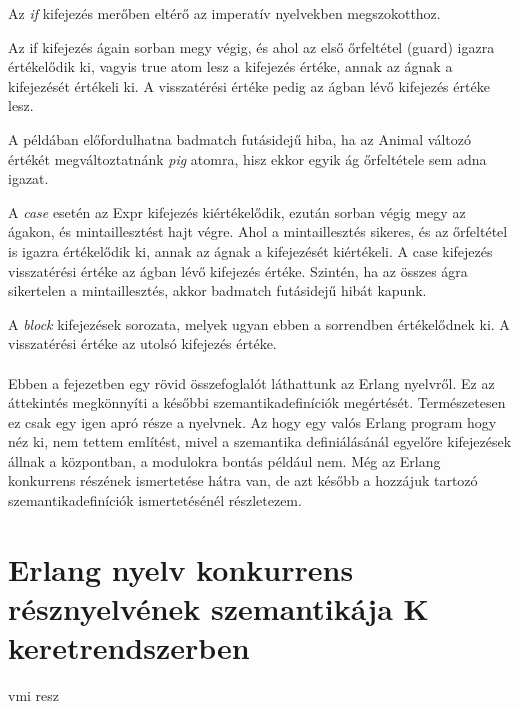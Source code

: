 \documentclass[twoside, a4paper, 12pt]{article}
\begin{document}
Az \textit{if} kifejezés merőben eltérő az imperatív nyelvekben megszokotthoz.



Az if kifejezés ágain sorban megy végig, és ahol az első őrfeltétel (guard) igazra értékelődik ki, vagyis true atom lesz a kifejezés értéke, annak az ágnak a kifejezését értékeli ki. A visszatérési értéke pedig az ágban lévő kifejezés értéke lesz.



A példában előfordulhatna badmatch futásidejű hiba, ha az Animal változó értékét megváltoztatnánk \textit{pig} atomra, hisz ekkor egyik ág őrfeltétele sem adna igazat.



A \textit{case} esetén az Expr kifejezés kiértékelődik, ezután sorban végig megy az ágakon, és mintaillesztést hajt végre. Ahol a mintaillesztés sikeres, és az őrfeltétel is igazra értékelődik ki, annak az ágnak a kifejezését kiértékeli. A case kifejezés visszatérési értéke az ágban lévő kifejezés értéke. Szintén, ha az összes ágra sikertelen a mintaillesztés, akkor badmatch futásidejű hibát kapunk.



A \textit{block} kifejezések sorozata, melyek ugyan ebben a sorrendben értékelődnek ki. A visszatérési értéke az utolsó kifejezés értéke.

\paragraph{}
Ebben a fejezetben egy rövid összefoglalót láthattunk az Erlang nyelvről. Ez az áttekintés megkönnyíti a későbbi szemantikadefiníciók megértését. Természetesen ez csak egy igen apró része a nyelvnek. Az hogy egy valós Erlang program hogy néz ki, nem tettem említést, mivel a szemantika definiálásánál egyelőre kifejezések állnak a központban, a modulokra bontás például nem. Még az Erlang konkurrens részének ismertetése hátra van, de azt később a hozzájuk tartozó szemantikadefiníciók ismertetésénél részletezem.

\section{Erlang nyelv konkurrens résznyelvének szemantikája K keretrendszerben}
vmi resz
\end{document}
